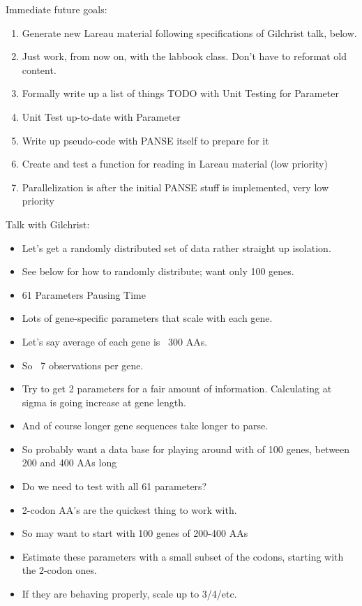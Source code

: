 \documentclass[12pt,hyperref]{labbook}
\begin{document}
Immediate future goals:
\begin{enumerate}
    \item Generate new Lareau material following specifications of Gilchrist talk, below.
    \item Just work, from now on, with the labbook class. Don't have to reformat old content.
    \item Formally write up a list of things TODO with Unit Testing for Parameter
    \item Unit Test up-to-date with Parameter
    \item Write up pseudo-code with PANSE itself to prepare for it
    \item Create and test a function for reading in Lareau material (low priority)
    \item Parallelization is after the initial PANSE stuff is implemented, very low priority
\end{enumerate}


Talk with Gilchrist:

\begin{itemize}
    \item Let's get a randomly distributed set of data rather straight up isolation.
    \item See below for how to randomly distribute; want only 100 genes.
    \item 61 Parameters Pausing Time
    \item Lots of gene-specific parameters that scale with each gene.
    \item Let's say average of each gene is ~300 AAs.
    \item So ~7 observations per gene.
    \item 
    Try to get 2 parameters for a fair amount of information. 
    Calculating at sigma is going increase at gene length.
    \item And of course longer gene sequences take longer to parse.
    \item So probably want a data base for playing around with of 100 genes, between 200 and 400 AAs long
    \item Do we need to test with all 61 parameters?
    \item 2-codon AA's are the quickest thing to work with. 
    \item So may want to start with 100 genes of 200-400 AAs
    \item Estimate these parameters with a small subset of the codons, starting with the 2-codon ones.
    \item If they are behaving properly, scale up to 3/4/etc.
\end{itemize}
\end{document}
